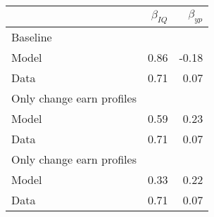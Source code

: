 \begin{tabular}{lrr}
\hline
  & $\beta_{IQ}$  & $\beta_{yp}$  \\
\hline
Baseline &   &   \\
Model & 0.86  & -0.18  \\
Data & 0.71  & 0.07  \\
Only change earn profiles &   &   \\
Model & 0.59  & 0.23  \\
Data & 0.71  & 0.07  \\
Only change earn profiles &   &   \\
Model & 0.33  & 0.22  \\
Data & 0.71  & 0.07  \\
\hline
\end{tabular}%
